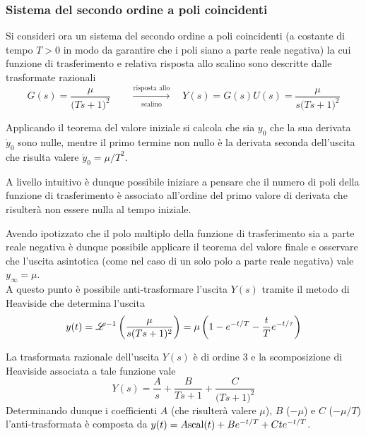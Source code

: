 		\subsubsection{Sistema del secondo ordine a poli coincidenti}
			Si consideri ora un sistema del secondo ordine a poli coincidenti (a costante di tempo $T >0$ in modo da garantire che i poli siano a parte reale negativa) la cui funzione di trasferimento e relativa risposta allo scalino sono descritte dalle trasformate razionali
			\[ G(s) =  \frac \mu{\big(Ts + 1\big)^2} \qquad \xrightarrow[\textrm{scalino}]{\textrm{risposta allo}} \quad Y(s) = G(s) U(s) = \frac \mu{s\big(Ts + 1\big)^2} \]
			
			Applicando il teorema del valore iniziale si calcola che sia $y_0$ che la sua derivata $\dot y_0$ sono nulle, mentre il primo termine non nullo è la derivata seconda dell'uscita che risulta valere $\ddot y_0 = \mu / T^2$.
			\begin{osservazione}
				A livello intuitivo è dunque possibile iniziare a pensare che il numero di poli della funzione di trasferimento è associato all'ordine del primo valore di derivata che risulterà non essere nulla al tempo iniziale.
			\end{osservazione}
			Avendo ipotizzato che il polo multiplo della funzione di trasferimento sia a parte reale negativa è dunque possibile applicare il teorema del valore finale e osservare che l'uscita asintotica (come nel caso di un solo polo a parte reale negativa) vale $y_\infty = \mu$. \\			
			A questo punto è possibile anti-trasformare l'uscita $Y(s)$ tramite il metodo di Heaviside che determina l'uscita
			\[ y(t) = \mathscr {L}^{-1} \left(  \frac \mu{s(Ts + 1)^2} \right) = \mu \left( 1- e^{-t/T} - \frac t T e^{-t/\tau} \right) \] 
			\begin{nota}
				La trasformata razionale dell'uscita $Y(s)$ è di ordine 3 e la scomposizione di Heaviside associata a tale funzione vale
				\[ Y(s) = \frac As + \frac B{Ts+1} + \frac C{\big(Ts+1\big)^2} \]
				Determinando dunque i coefficienti $A$ (che risulterà valere $\mu$), $B$ ($-\mu$) e $C$ ($-\mu/T$) l'anti-trasformata è composta da $y(t) = A \textrm{scal}(t) + Be^{-t/T} + Ct e^{-t/T}$.					 
			\end{nota}
			
			
